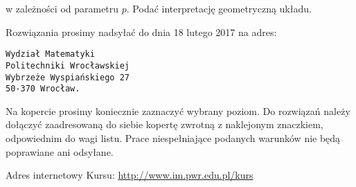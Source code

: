 \documentclass[10pt]{article}
\begin{document}
w zależności od parametru $p$. Podać interpretację geometryczną układu.

Rozwiązania prosimy nadsyłać do dnia 18 lutego 2017 na adres:

\begin{verbatim}
Wydział Matematyki
Politechniki Wrocławskiej
Wybrzeże Wyspiańskiego 27
50-370 Wrocław.
\end{verbatim}

Na kopercie prosimy koniecznie zaznaczyć wybrany poziom. Do rozwiązań należy dołączyć zaadresowaną do siebie kopertę zwrotną z naklejonym znaczkiem, odpowiednim do wagi listu. Prace niespełniające podanych warunków nie będą poprawiane ani odsyłane.

Adres internetowy Kursu: \href{http://www.im.pwr.edu.pl/kurs}{http://www.im.pwr.edu.pl/kurs}
\end{document}
